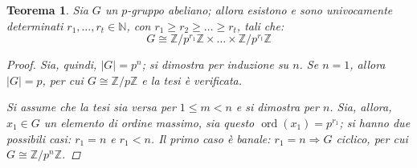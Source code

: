 \documentclass[11pt]{scrartcl}
\theoremstyle{style1}
\newtheorem{teorema}{Teorema}[section]
\numberwithin{equation}{subsection}
\begin{document}
\begin{teorema}\label{corts2}
	Sia $G$ un $p$-gruppo abeliano; allora esistono e sono univocamente determinati $r_1,\ldots,r_t \in \mathbb{N}$, con $r_1\ge r_2\ge \ldots\ge r_t$, tali che:
	\[
	G \cong \mathbb{Z}/p^{r_1}\mathbb{Z} \times  \ldots \times \mathbb{Z} / p^{r_t}\mathbb{Z}
	\] 
	\begin{proof}
		Sia, quindi, $\lvert G \rvert =p^{n}$; si dimostra per induzione su $n$.
		Se $n=1$, allora $\lvert G \rvert = p$, per cui $G \cong \mathbb{Z} / p\mathbb{Z}$ e la tesi \`e verificata.

		Si assume che la tesi sia versa per $1 \le m < n $ e si dimostra per $n$. 
		Sia, allora, $x_1 \in G$ un elemento di ordine massimo, sia questo $\operatorname{ord}(x_1) =p^{r_1} $; si hanno due possibili casi: $r_1 = n$ e $r_1<n$.
		Il primo caso \`e banale: $r_1=n \Rightarrow G$ ciclico, per cui $G \cong \mathbb{Z}/p^n\mathbb{Z}$.


\end{proof}
\end{teorema}
\end{document}
